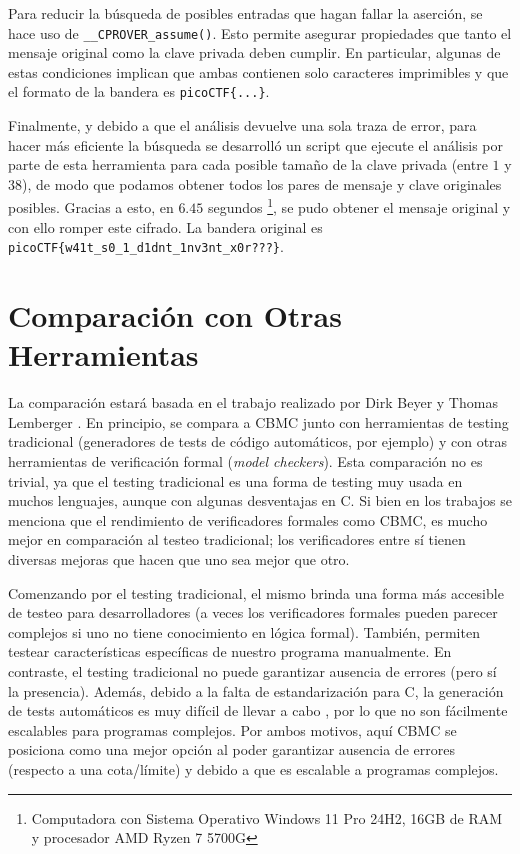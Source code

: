\documentclass[runningheads]{llncs}
\begin{document}
Para reducir la búsqueda de posibles entradas que hagan fallar la aserción, se hace uso de \verb|__CPROVER_assume()|.
Esto permite asegurar propiedades que tanto el mensaje original como la clave privada deben cumplir.
En particular, algunas de estas condiciones implican que ambas contienen solo caracteres imprimibles y que el formato de la bandera es \verb|picoCTF{...}|.

Finalmente, y debido a que el análisis devuelve una sola traza de error, para hacer más eficiente la búsqueda se desarrolló un script que ejecute el análisis por 
parte de esta herramienta para cada posible tamaño de la clave privada (entre $1$ y $38$), de modo que podamos obtener todos los pares de mensaje y clave originales posibles.
Gracias a esto, en $6.45$ segundos \footnote{Computadora con Sistema Operativo Windows 11 Pro 24H2, 16GB de RAM y procesador AMD Ryzen 7 5700G}, se pudo obtener 
el mensaje original y con ello romper este cifrado.
La bandera original es \verb|picoCTF{w41t_s0_1_d1dnt_1nv3nt_x0r???}|.

%
\section{Comparación con Otras Herramientas}
La comparación estará basada en el trabajo realizado por Dirk Beyer y Thomas Lemberger \cite{cbmc-comparison}.
En principio, se compara a CBMC junto con herramientas de testing tradicional (generadores de tests de código automáticos, por ejemplo) y
con otras herramientas de verificación formal (\textit{model checkers}).
Esta comparación no es trivial, ya que el testing tradicional es una forma de testing muy usada en muchos lenguajes, aunque con algunas desventajas en C.
Si bien en los trabajos se menciona que el rendimiento de verificadores formales como CBMC, es mucho mejor en comparación al testeo tradicional; los verificadores
entre sí tienen diversas mejoras que hacen que uno sea mejor que otro.

Comenzando por el testing tradicional, el mismo brinda una forma más accesible de testeo para desarrolladores (a veces los verificadores 
formales pueden parecer complejos si uno no tiene conocimiento en lógica formal).
También, permiten testear características específicas de nuestro programa manualmente.
En contraste, el testing tradicional no puede garantizar ausencia de errores (pero sí la presencia).
Además, debido a la falta de estandarización para C, la generación de tests automáticos es muy difícil de llevar a cabo \cite{cbmc-comparison}, 
por lo que no son fácilmente escalables para programas complejos.
Por ambos motivos, aquí CBMC se posiciona como una mejor opción al poder garantizar ausencia de errores (respecto a una cota/límite) y debido a que es escalable a programas complejos.
\end{document}
